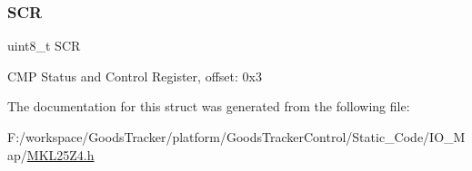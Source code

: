 \subsubsection{\texorpdfstring{S\+CR}{SCR}}
{\footnotesize\ttfamily uint8\+\_\+t S\+CR}

C\+MP Status and Control Register, offset\+: 0x3 

The documentation for this struct was generated from the following file\+:\begin{DoxyCompactItemize}
\item 
F\+:/workspace/\+Goods\+Tracker/platform/\+Goods\+Tracker\+Control/\+Static\+\_\+\+Code/\+I\+O\+\_\+\+Map/\hyperlink{_m_k_l25_z4_8h}{M\+K\+L25\+Z4.\+h}\end{DoxyCompactItemize}

